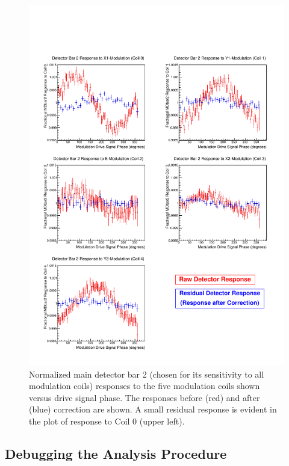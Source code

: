 \begin{figure}
\centering
\includegraphics[width=5.8in]{./Pictures/MD_response_vs_coil.pdf}
\caption{\label{fig:det_vs_ramp}Normalized main detector bar 2 (chosen for its sensitivity to all modulation coils) responses to the five modulation coils shown versus drive signal phase. The responses before (red) and after (blue) correction are shown. A small residual response is evident in the plot of response to Coil 0 (upper left).}
\end{figure}

\subsection{Debugging the Analysis Procedure}

